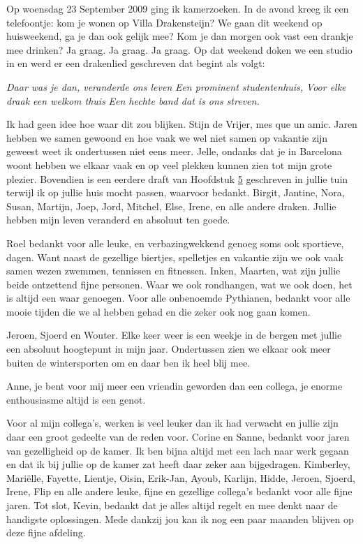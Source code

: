 \documentclass[openright,titlepage,12pt,a4paper]{book}
\begin{document}
\newpage

Op woensdag 23 September 2009 ging ik kamerzoeken. In de avond kreeg ik een telefoontje: kom je wonen op Villa Drakensteijn? We gaan dit weekend op huisweekend, ga je dan ook gelijk mee? Kom je dan morgen ook vast een drankje mee drinken? Ja graag. Ja graag. Ja graag. Op dat weekend doken we een studio in en werd er een drakenlied geschreven dat begint als volgt:

\emph{Daar was je dan, veranderde ons leven} \newline
\emph{Een prominent studentenhuis,} \newline
\emph{Voor elke draak een welkom thuis} \newline
\emph{Een hechte band dat is ons streven.}

Ik had geen idee hoe waar dit zou blijken. Stijn de Vrijer, mes que un amic. Jaren hebben we samen gewoond en hoe vaak we wel niet samen op vakantie zijn geweest weet ik ondertussen niet eens meer. Jelle, ondanks dat je in Barcelona woont hebben we elkaar vaak en op veel plekken kunnen zien tot mijn grote plezier. Bovendien is een eerdere draft van Hoofdstuk \protect\hyperlink{Burns}{5} geschreven in jullie tuin terwijl ik op jullie huis mocht passen, waarvoor bedankt. Birgit, Jantine, Nora, Susan, Martijn, Joep, Jord, Mitchel, Else, Irene, en alle andere draken. Jullie hebben mijn leven veranderd en absoluut ten goede.

Roel bedankt voor alle leuke, en verbazingwekkend genoeg soms ook sportieve, dagen. Want naast de gezellige biertjes, spelletjes en vakantie zijn we ook vaak samen wezen zwemmen, tennissen en fitnessen. Inken, Maarten, wat zijn jullie beide ontzettend fijne personen. Waar we ook rondhangen, wat we ook doen, het is altijd een waar genoegen. Voor alle onbenoemde Pythianen, bedankt voor alle mooie tijden die we al hebben gehad en die zeker ook nog gaan komen.

Jeroen, Sjoerd en Wouter. Elke keer weer is een weekje in de bergen met jullie een absoluut hoogtepunt in mijn jaar. Ondertussen zien we elkaar ook meer buiten de wintersporten om en daar ben ik heel blij mee.

Anne, je bent voor mij meer een vriendin geworden dan een collega, je enorme enthousiasme altijd is een genot.

Voor al mijn collega's, werken is veel leuker dan ik had verwacht en jullie zijn daar een groot gedeelte van de reden voor. Corine en Sanne, bedankt voor jaren van gezelligheid op de kamer. Ik ben bijna altijd met een lach naar werk gegaan en dat ik bij jullie op de kamer zat heeft daar zeker aan bijgedragen. Kimberley, Mariëlle, Fayette, Lientje, Oisin, Erik-Jan, Ayoub, Karlijn, Hidde, Jeroen, Sjoerd, Irene, Flip en alle andere leuke, fijne en gezellige collega's bedankt voor alle fijne jaren. Tot slot, Kevin, bedankt dat je alles altijd regelt en mee denkt naar de handigste oplossingen. Mede dankzij jou kan ik nog een paar maanden blijven op deze fijne afdeling.
\end{document}
